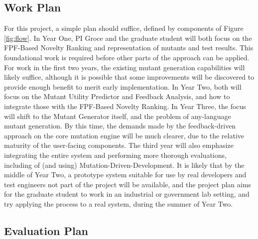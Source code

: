 \subsection{Work Plan}
\label{sec:workplan}


For this project, a simple plan should suffice, defined by components
of Figure \ref{fig:flow}.  In Year One, PI Groce and the graduate
student will both focus on the FPF-Based Novelty Ranking and
representation of mutants and test results.  This foundational work is
required before other parts of the approach can be applied.  For work
in the first two years, the existing mutant generation capabilities
will likely suffice, although it is possible that some improvements
will be discovered to provide enough benefit to merit early
implementation.  In Year
Two, both will focus on the Mutant Utility Predictor and Feedback
Analysis, and how to integrate those with the FPF-Based Novelty
Ranking.  In Year Three, the focus will shift to the Mutant Generator
itself, and the problem of any-language mutant generation.  By this
time, the demands made by the feedback-driven approach on the core
mutation engine will be much clearer, due to the relative maturity of
the user-facing components.  The third
year will also emphasize integrating the entire system and performing
more thorough evaluations, including of (and using) Mutation-Driven-Development.  It is likely that by the middle of Year
Two, a prototype system suitable for use by real developers and test
engineers not part of the project will be available, and the project
plan aims for the graduate student to work in an industrial or
government lab setting, and try applying the process to a real system,
during the summer of Year Two.

\subsection{Evaluation Plan}
\label{sec:evalplan}

